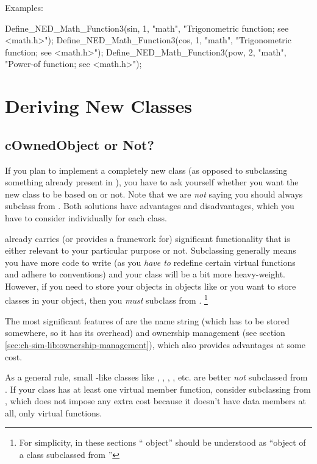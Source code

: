 Examples:

\begin{cpp}
Define_NED_Math_Function3(sin, 1, "math", "Trigonometric function; see <math.h>");
Define_NED_Math_Function3(cos, 1, "math", "Trigonometric function; see <math.h>");
Define_NED_Math_Function3(pow, 2, "math", "Power-of function; see <math.h>");
\end{cpp}



\section{Deriving New Classes}
\label{sec:ch-sim-lib:deriving-new-classes}

\subsection{cOwnedObject or Not?}

If you plan to implement a completely new class (as opposed to
subclassing something already present in {\opp}), you have
to ask yourself whether you want the new class to be based
on  or not.
Note that we are \textit{not} saying you should always
subclass from .
Both solutions have advantages and disadvantages, which you
have to consider individually for each class.

 already carries (or provides a framework for)
significant functionality that is either relevant to
your particular purpose or not. Subclassing 
generally means you have more code to write (as you \textit{have to}
redefine certain virtual functions and adhere to conventions)
and your class will be a bit more heavy-weight.
However, if you need to store your objects in {\opp} objects like 
or you want to store {\opp} classes in your object,
then you \textit{must} subclass from .
  \footnote{For simplicity, in these sections ``{\opp} object''
  should be understood as ``object of a class subclassed from
  ''}

The most significant features of  are
the name string (which has to be stored somewhere, so it has
its overhead) and ownership management (see section
\ref{sec:ch-sim-lib:ownership-management}), which
also provides advantages at some cost.

As a general rule, small -like classes like ,
, , , etc.
are better \textit{not} subclassed from .
If your class has at least one virtual member function, consider
subclassing from , which does not impose any
extra cost because it doesn't have data members at all, only
virtual functions.


